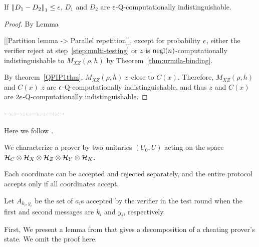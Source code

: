 \begin{rmk}
If $\left\lVert D_1-D_2\right\rVert_1\leq \epsilon$, $D_1$ and $D_2$ are $\epsilon$-Q-computationally indistinguishable.
\end{rmk}



\begin{proof}

By Lemma~\label{lem:partition}


 [[Partition lemma -> Parallel repetition]], except for probability $\epsilon$, either the verifier reject at step~\ref{step:multi-testing} or $z$ is $\operatorname{negl}(n)$-computationally indistinguishable to $M_{XZ}(\rho,h)$ by Theorem~\ref{thm:urmila-binding}. 
 
 By theorem~\ref{QPIP1thm}, $M_{XZ}(\rho,h)$  $\epsilon$-close to $C(x)$. Therefore, $M_{XZ}(\rho,h)$  and  $C(x)$ $z$ are $\epsilon$-Q-computationally indistinguishable, and thus $z$ and $C(x)$ are  $2\epsilon$-Q-computationally indistinguishable.
 
 
\end{proof}
===========


Here we follow \cite{parallelrep}.

We characterize a prover by two unitaries $(U_0, U)$ acting on the space $\mathcal{H}_C\otimes\mathcal{H}_X\otimes\mathcal{H}_Z\otimes\mathcal{H}_Y\otimes\mathcal{H}_K$.


Each coordinate can be accepted and rejected separately, and the entire protocol accepts only if all coordinates accept.

Let $A_{k_i, y_i}$ be the set of $a_i$s accepted by the verifier in the test round when the first and second messages are $k_i$ and $y_i$, respectively.






First, We present a lemma from \cite{parallelrep}  that gives a decomposition of a cheating prover's state. We omit the proof here.

